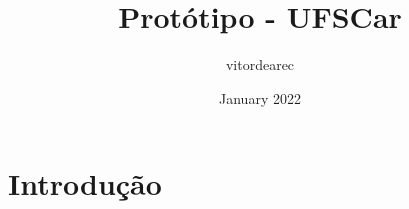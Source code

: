 \title{Protótipo - UFSCar}
\author{vitordearec }
\date{January 2022}




\newpage
\setcounter{page}{1}

\section{Introdução}